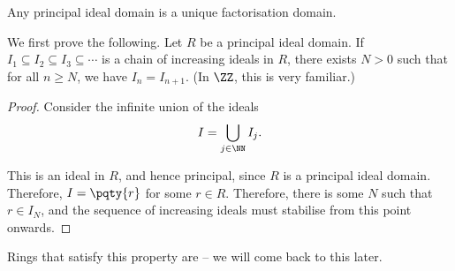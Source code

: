 \begin{theorem}
    \label{thm:pid-ufd}%
    Any principal ideal domain is a unique factorisation domain.
\end{theorem}

We first prove the following. Let \(R\) be a principal ideal domain. If \(I_1 \subseteq I_2 \subseteq I_3 \subseteq \cdots\) is a chain of increasing ideals in \(R\), there exists \(N > 0\) such that for all \(n \geq N\), we have \(I_n = I_{n + 1}\). (In \(\ZZ\), this is very familiar.)

\begin{proof}
    Consider the infinite union of the ideals
    \[
        I = \bigcup_{j \in \NN} I_j.
    \]

    This is an ideal in \(R\), and hence principal, since \(R\) is a principal ideal domain. Therefore, \(I = \pqty{r}\) for some \(r \in R\). Therefore, there is some \(N\) such that \(r \in I_N\), and the sequence of increasing ideals must stabilise from this point onwards.
\end{proof}

Rings that satisfy this property are  -- we will come back to this later.

